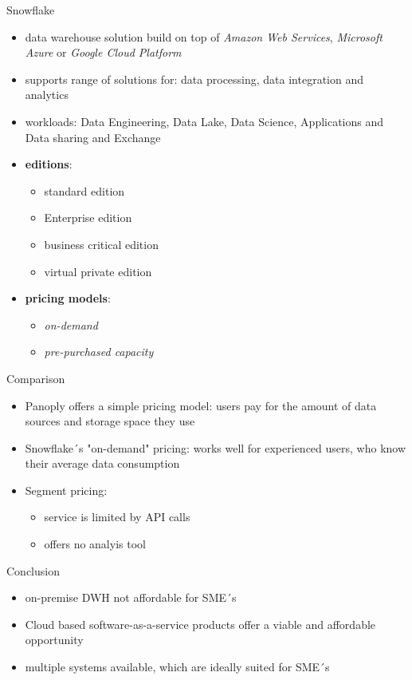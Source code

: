 \documentclass[aspectratio=169]{beamer}
\begin{document}
  \begin{frame}{Snowflake}
    \begin{itemize}
      \item data warehouse solution build on top of \textit{Amazon Web Services}, \textit{Microsoft Azure} or \textit{Google Cloud Platform}
      \item supports range of solutions for: data processing, data integration and analytics
      \item workloads: Data Engineering, Data Lake, Data Science, Applications and Data sharing and Exchange
      \item \textbf{editions}:
      \begin{itemize}
        \item standard edition
        \item Enterprise edition
        \item business critical edition
        \item virtual private edition
      \end{itemize}
      \item  \textbf{pricing models}:
      \begin{itemize}
        \item \textit{on-demand}
        \item \textit{pre-purchased capacity}
      \end{itemize}
    \end{itemize}
  \end{frame}

  \begin{frame}{Comparison}
    \begin{itemize}
      \item Panoply offers a simple pricing model: users pay for the amount of data sources and storage space they use
      \item Snowflake´s "on-demand" pricing: works well for experienced users, who know their average data consumption
      \item Segment pricing:
      \begin{itemize}
        \item service is limited by API calls
        \item offers no analyis tool
      \end{itemize}
    \end{itemize}
  \end{frame}

  \begin{frame}{Conclusion}
    \begin{itemize}
      \item on-premise DWH not affordable for SME´s
      \item Cloud based software-as-a-service products offer a viable and affordable opportunity
      \item multiple systems available, which are ideally suited for SME´s
    \end{itemize}
  \end{frame}
\end{document}
